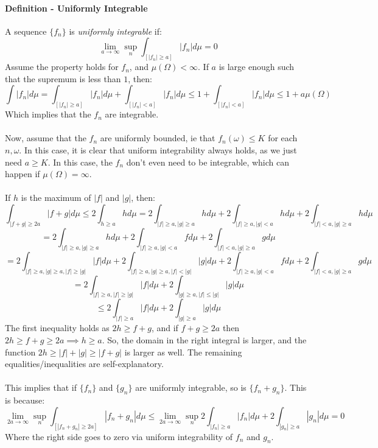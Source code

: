 \documentclass[12pt,a4paper]{article}
\newcommand{\1}[1]{\mathbbm{1}\left\{ #1 \right\}}
\begin{document}
\paragraph{Definition - Uniformly Integrable} A sequence $\{f_n\}$ is \textit{uniformly integrable} if:
$$
	\lim_{a \to \infty} \sup_n \int_{[|f_n| \geq a]} |f_n| d\mu = 0
$$
Assume the property holds for $f_n$, and $\mu(\Omega) < \infty$. If $a$ is large enough such that the supremum is less than $1$, then:
$$
	\int |f_n| d\mu = \int_{[|f_n| \geq a]} |f_n| d\mu + \int_{[|f_n| < a]} |f_n| d\mu
	\leq 1 + \int_{[|f_n| < a]} |f_n| d\mu \leq 1 + a\mu(\Omega)
$$
Which implies that the $f_n$ are integrable.
\\\\
Now, assume that the $f_n$ are uniformly bounded, ie that $f_n(\omega) \leq K$ for each $n, \omega$. In this case, it is clear that uniform integrability always holds, as we just need $a \geq K$. In this case, the $f_n$ don't even need to be integrable, which can happen if $\mu(\Omega) = \infty$.
\\\\
If $h$ is the maximum of $|f|$ and $|g|$, then:
$$
	\int_{|f + g| \geq 2a} |f + g| d\mu \leq 2\int_{h \geq a} h d\mu =
	2\int_{|f| \geq a, |g| \geq a} h d\mu + 2\int_{|f| \geq a, |g| < a} h d\mu +
	2\int_{|f| < a, |g| \geq a} h d\mu
$$
$$
	=
	2\int_{|f| \geq a, |g| \geq a} h d\mu + 2\int_{|f| \geq a, |g| < a} f d\mu +
	2\int_{|f| < a, |g| \geq a} g d\mu
$$
$$
	=
	2\int_{|f| \geq a, |g| \geq a, |f| \geq |g|} |f| d\mu + 
	2\int_{|f| \geq a, |g| \geq a, |f| < |g|} |g| d\mu +
	2\int_{|f| \geq a, |g| < a} f d\mu +
	2\int_{|f| < a, |g| \geq a} g d\mu
$$
$$
	= 
	2\int_{|f| \geq a, |f| \geq |g|} |f| d\mu +
	2\int_{|g| \geq a, |f| \leq |g|} |g| d\mu
$$
$$
	\leq
	2\int_{|f| \geq a} |f| d\mu +
	2\int_{|g| \geq a} |g| d\mu	
$$
The first inequality holds as $2h \geq f + g$, and if $f + g \geq 2a$ then $2h \geq f + g \geq 2a \implies h \geq a$. So, the domain in the right integral is larger, and the function $2h \geq |f| + |g| \geq |f + g|$ is larger as well. The remaining equalities/inequalities are self-explanatory.
\\\\
This implies that if $\{f_n\}$ and $\{g_n\}$ are uniformly integrable, so is $\{f_n + g_n\}$. This is because:
$$
	\lim_{2a \to \infty} \sup_n \int_{[|f_n + g_n| \geq 2a]} |f_n + g_n| d\mu \leq
	\lim_{2a \to \infty} \sup_n 
	2\int_{|f_n| \geq a} |f_n| d\mu +
	2\int_{|g_n| \geq a} |g_n| d\mu	= 0
$$
Where the right side goes to zero via uniform integrability of $f_n$ and $g_n$.
\end{document}
